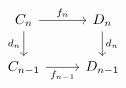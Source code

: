 \documentclass{standalone}
\begin{document}
$\displaystyle  \begin{tikzcd} C_n \arrow{r}{f_n} \arrow[swap]{d}{d_n} & D_n \arrow{d}{d_n} \\ C_{n - 1} \arrow[swap]{r}{f_{n - 1}} & D_{n - 1} \end{tikzcd} $
\end{document}
